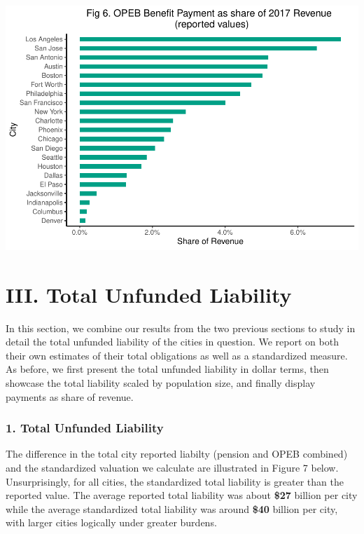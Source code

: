 \documentclass[
]{article}
\begin{document}
\includegraphics{City-Solvency-Report--Adjusted-_files/figure-latex/unnamed-chunk-11-1.pdf}

\hypertarget{iii.-total-unfunded-liability}{%
\section{III. Total Unfunded
Liability}\label{iii.-total-unfunded-liability}}

In this section, we combine our results from the two previous sections
to study in detail the total unfunded liability of the cities in
question. We report on both their own estimates of their total
obligations as well as a standardized measure. As before, we first
present the total unfunded liability in dollar terms, then showcase the
total liability scaled by population size, and finally display payments
as share of revenue.

\hypertarget{total-unfunded-liability}{%
\subsubsection{1. Total Unfunded
Liability}\label{total-unfunded-liability}}

The difference in the total city reported liabilty (pension and OPEB
combined) and the standardized valuation we calculate are illustrated in
Figure 7 below. Unsurprisingly, for all cities, the standardized total
liability is greater than the reported value. The average reported total
liability was about \textbf{\$27} billion per city while the average
standardized total liability was around \textbf{\$40} billion per city,
with larger cities logically under greater burdens.
\end{document}
